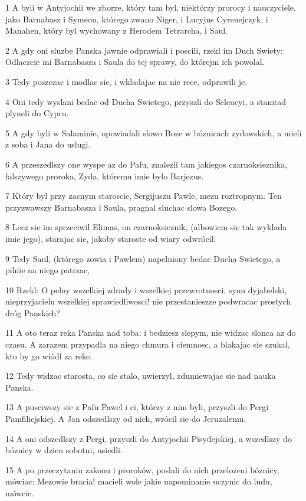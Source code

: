 \par 1 A byli w Antyjochii we zborze, który tam byl, niektórzy prorocy i nauczyciele, jako Barnabasz i Symeon, którego zwano Niger, i Lucyjus Cyrenejczyk, i Manahen, który byl wychowany z Herodem Tetrarcha, i Saul.
\par 2 A gdy oni sluzbe Panska jawnie odprawiali i poscili, rzekl im Duch Swiety: Odlaczcie mi Barnabasza i Saula do tej sprawy, do którejm ich powolal.
\par 3 Tedy poszczac i modlac sie, i wkladajac na nie rece, odprawili je.
\par 4 Oni tedy wyslani bedac od Ducha Swietego, przyszli do Seleucyi, a stamtad plyneli do Cypru.
\par 5 A gdy byli w Salaminie, opowiadali slowo Boze w bóznicach zydowskich, a mieli z soba i Jana do uslugi.
\par 6 A przeszedlszy one wyspe az do Pafu, znalezli tam jakiegos czarnoksieznika, falszywego proroka, Zyda, któremu imie bylo Barjezus.
\par 7 Który byl przy zacnym staroscie, Sergijuszu Pawle, mezu roztropnym. Ten przyzwawszy Barnabasza i Saula, pragnal sluchac slowa Bozego.
\par 8 Lecz sie im sprzeciwil Elimas, on czarnoksieznik, (albowiem sie tak wyklada imie jego), starajac sie, jakoby staroste od wiary odwrócil:
\par 9 Tedy Saul, (którego zowia i Pawlem) napelniony bedac Ducha Swietego, a pilnie na niego patrzac,
\par 10 Rzekl: O pelny wszelkiej zdrady i wszelkiej przewrotnosci, synu dyjabelski, nieprzyjacielu wszelkiej sprawiedliwosci! nie przestanieszze podwracac prostych dróg Panskich?
\par 11 A oto teraz reka Panska nad toba: i bedziesz slepym, nie widzac slonca az do czasu. A zarazem przypadla na niego chmura i ciemnosc, a blakajac sie szukal, kto by go wiódl za reke.
\par 12 Tedy widzac starosta, co sie stalo, uwierzyl, zdumiewajac sie nad nauka Panska.
\par 13 A pusciwszy sie z Pafu Pawel i ci, którzy z nim byli, przyszli do Pergi Pamfiliejskiej. A Jan odszedlszy od nich, wrócil sie do Jeruzalemu.
\par 14 A oni odszedlszy z Pergi, przyszli do Antyjochii Pisydejskiej, a wszedlszy do bóznicy w dzien sobotni, usiedli.
\par 15 A po przeczytaniu zakonu i proroków, poslali do nich przelozeni bóznicy, mówiac: Mezowie bracia! macieli wole jakie napominanie uczynic do ludu, mówcie.
